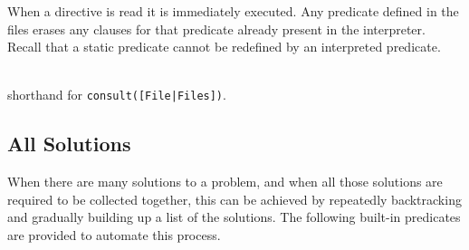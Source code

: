 \begin{description}
	When a directive is read it is immediately executed.  Any predicate
	defined in the files erases any clauses for that predicate already
	present in the interpreter. Recall that a static predicate
	cannot be redefined by an interpreted predicate.

\item [{\tt [File|Files]}]~\\
	shorthand for {\tt consult([File|Files])}.

\end{description}


\subsection{All Solutions}

When there are many solutions to a problem, and when all those solutions
are required to be collected together, this can be achieved by repeatedly
backtracking and gradually building up a list of the solutions.  The
following built-in predicates are provided to automate this process.

